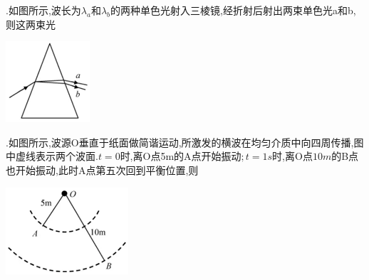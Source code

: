 \question[6].如图所示,波长为$λ_a$和$λ_b$的两种单色光射入三棱镜,经折射后射出两束单色光a和b,则这两束光\key{}\begin{center}\includegraphics[]{img/image12.png}\end{center}
\begin{solution}{4cm}

\end{solution}



\question[6].如图所示,波源O垂直于纸面做简谐运动,所激发的横波在均匀介质中向四周传播,图中虚线表示两个波面$.t=0$时,离O点5m的A点开始振动$;t=1s$时,离O点$10m$的B点也开始振动,此时A点第五次回到平衡位置,则\key{}\begin{center}\includegraphics[]{img/image13.png}\end{center}
\begin{solution}{4cm}

\end{solution}



